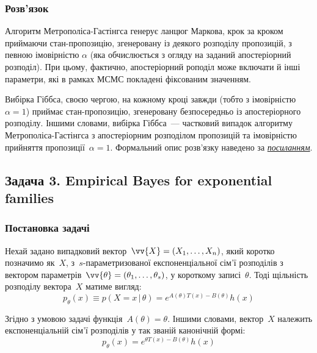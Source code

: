 \documentclass{mathreport}
\begin{document}
\subsubsection*{Розв'язок}

Алгоритм Метрополіса-Гастінгса генерує ланцюг Маркова, крок за кроком приймаючи стан-пропозицію, згенеровану із деякого розподілу пропозицій, з певною імовірністю $\alpha$ (яка обчислюється з огляду на заданий апостеріорний розподіл). При цьому, фактично, апостеріорний роподіл може включати й інші параметри, які в рамках МСМС покладені фіксованим значенням. 

Вибірка Гіббса, своєю чергою, на кожному кроці завжди (тобто з імовірністю $\alpha=1$) приймає стан-пропозицію, згенеровану безпосередньо із апостеріорного розподілу. Іншими словами, вибірка Гіббса~--- частковий випадок алгоритму Метрополіса-Гастінгса з апостеріорним розподілом пропозицій та імовірністю прийняття пропозиції~$\alpha=1$. Формальний опис розв'язку наведено за \href{https://gregorygundersen.com/blog/2020/02/23/gibbs-sampling/}{\textit{посиланням}}.

\newpage
\subsection*{Задача 3. Empirical Bayes for exponential families}

\setcounter{subsection}{3}
\setcounter{equation}{0}

\subsubsection*{Постановка задачі}

Нехай задано випадковий вектор~$\vv{X}=(X_1,\ldots,X_n)$, який коротко позначимо як~$X$, з~$s$-параметризованої експоненціальної сім'ї розподілів з вектором параметрів~$\vv{\theta}=(\theta_1,\ldots,\theta_s)$, у короткому записі~$\theta$. Тоді щільність розподілу вектора~$X$ матиме вигляд:
\begin{equation}
    p_{\theta}(x) \equiv p(X=x \,|\, \theta) = e^{A(\theta)T(x) - B(\theta)}h(x)
\end{equation}

Згідно з умовою задачі функція~$A(\theta)=\theta$. Іншими словами, вектор~$X$ належить експоненціальній сім'ї розподілів у так званій канонічній формі:
\begin{equation}
    p_{\theta}(x) = e^{\theta T(x) - B(\theta)}h(x)
\end{equation}
\end{document}
